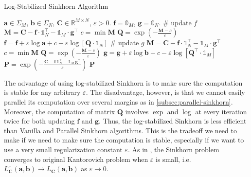 \begin{algorithm}[H]
  \caption{Log-Stabilized Sinkhorn Algorithm}
  \begin{algorithmic}[1]\label{algo:log-sinkhorn}
    \Require $\mathbf{a} \in \Sigma_M$, $\mathbf{b} \in \Sigma_N$, $\mathbf{C} \in \mathbb{R}^{M\times N}$, $\varepsilon > 0$.
    \Initialize $\mathbf{f} = \mathbb{0}_M$, $\mathbf{g} = \mathbb{0}_N$.
    \State \# update $f$
    \State $\mathbf{M} = \mathbf{C} - \mathbf{f}\cdot \mathbb{1}_N^\top - \mathbb{1}_M\cdot \mathbf{g}^\top$
    \State $c = \min \mathbf{M}$
    \State $\mathbf{Q} = \exp \left(
      -\frac{\mathbf{M} - c}{\varepsilon}
      \right)$
    \State $\mathbf{f} = \mathbf{f} + \varepsilon\log \mathbf{a} + c
      - \varepsilon\log \left[
        \mathbf{Q} \cdot\mathbb{1}_N
        \right]$
    \State \# update $g$
    \State $\mathbf{M} = \mathbf{C} - \mathbf{f}\cdot \mathbb{1}_N^\top - \mathbb{1}_M\cdot \mathbf{g}^\top$
    \State $c = \min \mathbf{M}$
    \State $\mathbf{Q} = \exp \left(
      -\frac{\mathbf{M} - c}{\varepsilon}
      \right)$
    \State $\mathbf{g} = \mathbf{g} + \varepsilon \log\mathbf{b} + c
      -\varepsilon\log \left[
        \mathbf{Q}^\top
        \cdot \mathbb{1}_M
        \right]$
    \EndWhile
    \State $\mathbf{P} = \exp \left(
      - \frac{\mathbf{C} - \mathbf{f}\,\mathbb{1}_N^\top - \mathbb{1}_M\,\mathbf{g}^\top}{\varepsilon}
      \right)$
    \Ensure $\mathbf{P}$
  \end{algorithmic}
\end{algorithm}

\begin{remark}[]
  The advantage of using log-stabilized Sinkhorn is to make sure the computation is stable for any arbitrary $\varepsilon$.
  The disadvantage, however, is that we cannot easily parallel its computation over several margins as in
  \cref{subsec:parallel-sinkhorn}.
  Moreover, the computation of matrix $\mathbf{Q}$ involves $\exp$ and $\log$ at every iteration twice
  for both updating $\mathbf{f}$ and $\mathbf{g}$.
  Thus, the log-stabilized Sinkhorn is less efficient than Vanilla and Parallel Sinkhorn algorithms.
  This is the tradeoff we need to make if we need to make sure the computation is stable,
  especially if we want to use a very small regularization constant $\varepsilon$.
  As in \citet[Chapter 4.1]{peyre2019},
  the Sinkhorn problem converges to original Kantorovich problem when $\varepsilon$ is small,
  i.e. $L_{\mathbf{C}}^\varepsilon(\mathbf{a},\mathbf{b}) \to L_{\mathbf{C}}(\mathbf{a},\mathbf{b})$
  as $\varepsilon \to 0$.
\end{remark}

